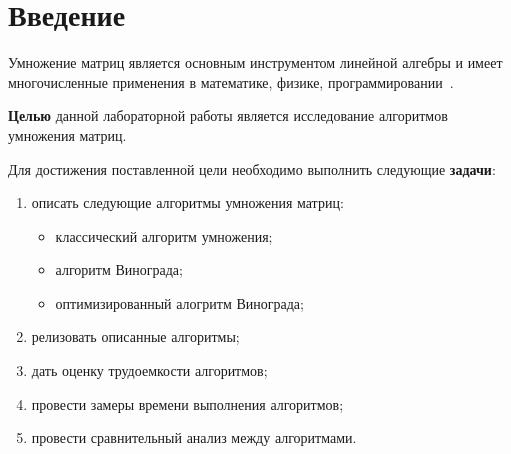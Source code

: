 \chapter*{Введение}

Умножение матриц является основным инструментом линейной алгебры и имеет многочисленные применения в математике, физике, программировании~\cite{vinograd-haskell}. 

\textbf{Целью} данной лабораторной работы является исследование алгоритмов умножения матриц.

Для достижения поставленной цели необходимо выполнить следующие \textbf{задачи}:
\begin{enumerate}[label={\arabic*)}]
    \item описать следующие алгоритмы умножения матриц:
        \begin{itemize}
            \item классический алгоритм умножения;
            \item алгоритм Винограда;
            \item оптимизированный алогритм Винограда;
        \end{itemize}
    \item релизовать описанные алгоритмы;
    \item дать оценку трудоемкости алгоритмов;
    \item провести замеры времени выполнения алгоритмов;
    \item провести сравнительный анализ между алгоритмами.
\end{enumerate}